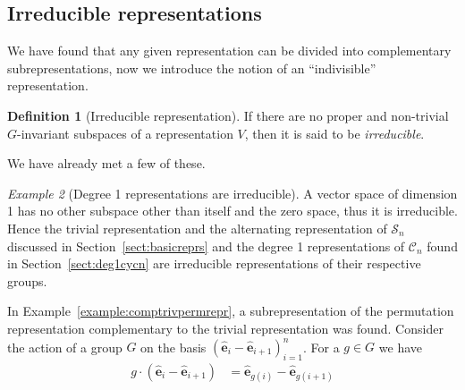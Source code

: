 \documentclass[12pt, a4paper, twoside]{article}
\theoremstyle{definition}
\newtheorem{definition}{Definition}[section]
\theoremstyle{remark}
\newtheorem{example}[definition]{Example}
\numberwithin{equation}{section}
\newcommand{\1}{\mathbf{1}}
\newcommand{\0}{\mathbf{0}}
\newcommand{\Sym}{\mathcal{S}} %
\newcommand{\Cyc}{\mathcal{C}}%
\newcommand{\bas}{\mathbf{\hat{e}}}
\begin{document}





\clearpage{\thispagestyle{empty}\cleardoublepage}
{\hypersetup{linkcolor=black}
\tableofcontents
}

%






\subsection{Irreducible representations}
	
	We have found that any given representation can be divided into complementary subrepresentations, now we introduce the notion of an ``indivisible'' representation.
	
	\begin{definition}[Irreducible representation]
		If there are no proper and non-trivial $G$-invariant subspaces of a representation $V$, then it is said to be \textit{irreducible}. 
	\end{definition}
	
	We have already met a few of these.
	
	\begin{example}[Degree 1 representations are irreducible]\cite[Example 1.4.2.]{Sagan}
		A vector space of dimension 1 has no other subspace other than itself and the zero space, thus it is irreducible. Hence the trivial representation and the alternating representation of $\Sym_n$ discussed in Section~\ref{sect:basicreprs} and the degree 1 representations of $\Cyc_n$ found in Section~\ref{sect:deg1cycn} are irreducible representations of their respective groups.
	\end{example}
	
	In Example~\ref{example:comptrivpermrepr}, a subrepresentation of the permutation representation complementary to the trivial representation was found. Consider the action of a group $G$ on the basis $(\bas_i - \bas_{i+1})_{i=1}^n$. For a $g \in G$ we have
	\begin{align*}
		g \cdot (\bas_i - \bas_{i+1}) &= \bas_{g(i)} - \bas_{g(i+1)}
	\end{align*}
	
\end{document}
